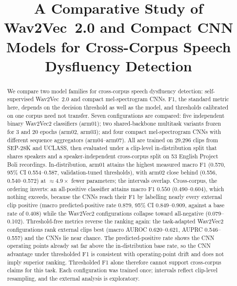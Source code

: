 \documentclass[a4paper,orivec]{llncs}
\begin{document}
%
\title{A Comparative Study of {Wav2Vec}~2.0 and Compact {CNN} Models for
Cross-Corpus Speech Dysfluency Detection}
%
%
\author{}
%
\authorrunning{}
%
\institute{}
%
\maketitle              %
%
\begin{abstract}
We compare two model families for cross-corpus speech dysfluency detection:
self-supervised Wav2Vec~2.0 and compact mel-spectrogram CNNs. F1, the standard
metric here, depends on the decision threshold as well as the model,
and thresholds calibrated on one corpus need not transfer. Seven
configurations are compared: five independent binary Wav2Vec2 classifiers
(arm01); two shared-backbone multitask variants frozen for 3
and 20 epochs (arm02, arm03); and four compact mel-spectrogram CNNs with
different sequence aggregators (arm04--arm07). All are trained on 29{,}296
clips from SEP-28K and UCLASS, then evaluated under a
clip-level in-distribution split that shares speakers and a speaker-independent
cross-corpus split on 53 English Project Boli recordings. In-distribution, arm01 attains
the highest measured macro F1 (0.570, 95\% CI 0.554--0.587, validation-tuned
thresholds), with arm02 close behind (0.556, 0.540--0.572) at
${\approx}4.9\times$ fewer parameters; the intervals overlap. Cross-corpus, the
ordering inverts: an all-positive classifier attains macro F1 $0.550$
(0.490--0.604), which nothing exceeds, because the CNNs reach their F1
by labelling nearly every external clip positive (macro predicted-positive rate
0.879, 95\% CI 0.849--0.909, against a base rate of 0.408) while the Wav2Vec2
configurations collapse toward all-negative (0.079--0.102). Threshold-free
metrics reverse the ranking again: the task-adapted Wav2Vec2 configurations
rank external clips best (macro AUROC 0.620--0.621, AUPRC 0.546--0.557) and
the CNNs lie near chance. The predicted-positive rate shows the CNN operating
points already sat far above the in-distribution base rate, so the CNN advantage
under thresholded F1 is consistent with operating-point drift and does not
imply superior ranking. Thresholded F1 alone therefore cannot support
cross-corpus claims for this task. Each configuration was trained once;
intervals reflect clip-level resampling, and the external analysis is
exploratory.
\end{abstract}
%
\end{document}
